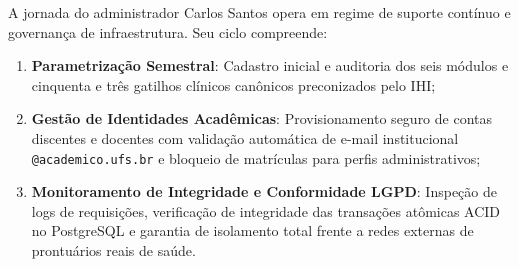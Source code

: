 A jornada do administrador Carlos Santos opera em regime de suporte contínuo e governança de infraestrutura. Seu ciclo compreende:
\begin{enumerate}
    \item \textbf{Parametrização Semestral}: Cadastro inicial e auditoria dos seis módulos e cinquenta e três gatilhos clínicos canônicos preconizados pelo IHI;
    \item \textbf{Gestão de Identidades Acadêmicas}: Provisionamento seguro de contas discentes e docentes com validação automática de e-mail institucional \texttt{@academico.ufs.br} e bloqueio de matrículas para perfis administrativos;
    \item \textbf{Monitoramento de Integridade e Conformidade LGPD}: Inspeção de logs de requisições, verificação de integridade das transações atômicas ACID no PostgreSQL e garantia de isolamento total frente a redes externas de prontuários reais de saúde.
\end{enumerate}
